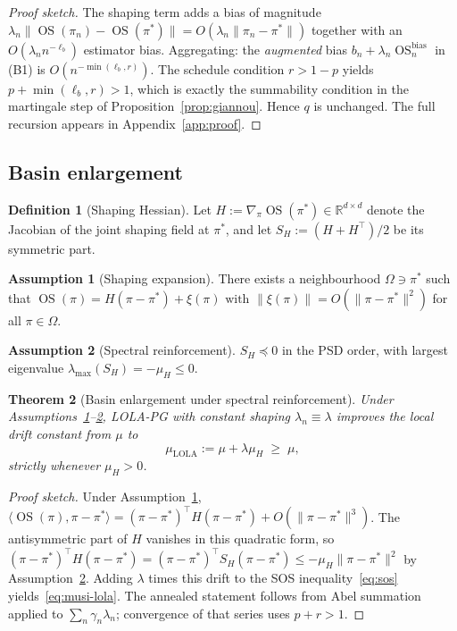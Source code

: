 \documentclass{article}
\theoremstyle{plain}
\newtheorem{theorem}{Theorem}[section]
\theoremstyle{definition}
\newtheorem{assumption}{Assumption}
\newtheorem{definition}[theorem]{Definition}
\theoremstyle{remark}
\DeclareMathOperator{\OS}{OS}
\begin{document}
\begin{proof}[Proof sketch]
The shaping term adds a bias of magnitude $\lambda_n\|\OS(\pi_n)-\OS(\pi^\ast)\| = O(\lambda_n\|\pi_n-\pi^\ast\|)$ together with an $O(\lambda_n n^{-\ell_b})$ estimator bias. Aggregating: the \emph{augmented} bias $b_n+\lambda_n\OS_n^{\mathrm{bias}}$ in (B1) is $O(n^{-\min(\ell_b,r)})$. The schedule condition $r>1-p$ yields $p+\min(\ell_b,r)>1$, which is exactly the summability condition in the martingale step of Proposition~\ref{prop:giannou}. Hence $q$ is unchanged. The full recursion appears in Appendix~\ref{app:proof}.
\end{proof}

\subsection{Basin enlargement}

\begin{definition}[Shaping Hessian]\label{def:hessian}
Let $H := \nabla_\pi \OS(\pi^\ast)\in\mathbb{R}^{d\times d}$ denote the Jacobian of the joint shaping field at $\pi^\ast$, and let $S_H := (H+H^\top)/2$ be its symmetric part.
\end{definition}

\begin{assumption}[Shaping expansion]\label{as:expand}
There exists a neighbourhood $\Omega\ni\pi^\ast$ such that
\(
\OS(\pi) = H(\pi-\pi^\ast) + \xi(\pi) \text{ with } \|\xi(\pi)\| = O(\|\pi-\pi^\ast\|^2)
\)
for all $\pi\in\Omega$.
\end{assumption}

\begin{assumption}[Spectral reinforcement]\label{as:spec}
$S_H\preceq 0$ in the PSD order, with largest eigenvalue $\lambda_{\max}(S_H) = -\mu_H\le 0$.
\end{assumption}

\begin{theorem}[Basin enlargement under spectral reinforcement]\label{thm:lola-basin}
Under Assumptions~\ref{as:expand}--\ref{as:spec}, LOLA-PG with \emph{constant} shaping $\lambda_n\equiv\lambda$ improves the local drift constant from $\mu$ to
\begin{equation}\label{eq:musi-lola}
\mu_{\mathrm{LOLA}} := \mu + \lambda\mu_H \;\ge\; \mu,
\end{equation}
strictly whenever $\mu_H>0$.
\end{theorem}

\begin{proof}[Proof sketch]
Under Assumption~\ref{as:expand}, $\langle\OS(\pi),\pi-\pi^\ast\rangle = (\pi-\pi^\ast)^\top H(\pi-\pi^\ast)+O(\|\pi-\pi^\ast\|^3)$. The antisymmetric part of $H$ vanishes in this quadratic form, so $(\pi-\pi^\ast)^\top H(\pi-\pi^\ast) = (\pi-\pi^\ast)^\top S_H(\pi-\pi^\ast) \le -\mu_H\|\pi-\pi^\ast\|^2$ by Assumption~\ref{as:spec}. Adding $\lambda$ times this drift to the SOS inequality~\eqref{eq:sos} yields~\eqref{eq:musi-lola}. The annealed statement follows from Abel summation applied to $\sum_n\gamma_n\lambda_n$; convergence of that series uses $p+r>1$.
\end{proof}
\end{document}

